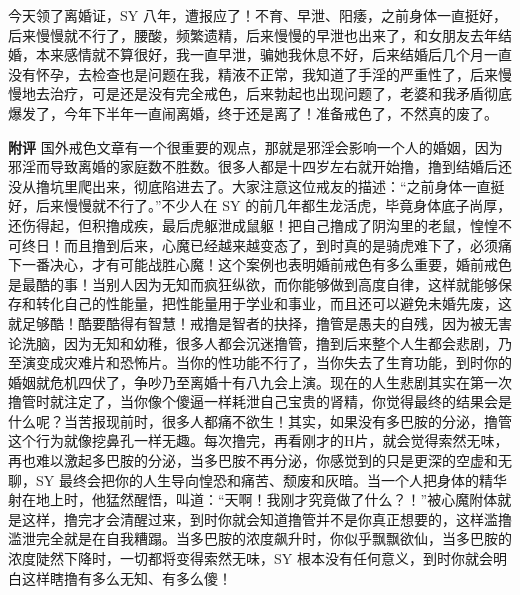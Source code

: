 \begin{case}
    今天领了离婚证，SY 八年，遭报应了！不育、早泄、阳痿，之前身体一直挺好，后来慢慢就不行了，腰酸，频繁遗精，后来慢慢的早泄也出来了，和女朋友去年结婚，本来感情就不算很好，我一直早泄，骗她我休息不好，后来结婚后几个月一直没有怀孕，去检查也是问题在我，精液不正常，我知道了手淫的严重性了，后来慢慢地去治疗，可是还是没有完全戒色，后来勃起也出现问题了，老婆和我矛盾彻底爆发了，今年下半年一直闹离婚，终于还是离了！准备戒色了，不然真的废了。

    \textbf{附评} 国外戒色文章有一个很重要的观点，那就是邪淫会影响一个人的婚姻，因为邪淫而导致离婚的家庭数不胜数。很多人都是十四岁左右就开始撸，撸到结婚后还没从撸坑里爬出来，彻底陷进去了。大家注意这位戒友的描述：“之前身体一直挺好，后来慢慢就不行了。”不少人在 SY 的前几年都生龙活虎，毕竟身体底子尚厚，还伤得起，但积撸成疾，最后虎躯泄成鼠躯！把自己撸成了阴沟里的老鼠，惶惶不可终日！而且撸到后来，心魔已经越来越变态了，到时真的是骑虎难下了，必须痛下一番决心，才有可能战胜心魔！这个案例也表明婚前戒色有多么重要，婚前戒色是最酷的事！当别人因为无知而疯狂纵欲，而你能够做到高度自律，这样就能够保存和转化自己的性能量，把性能量用于学业和事业，而且还可以避免未婚先废，这就足够酷！酷要酷得有智慧！戒撸是智者的抉择，撸管是愚夫的自残，因为被无害论洗脑，因为无知和幼稚，很多人都会沉迷撸管，撸到后来整个人生都会悲剧，乃至演变成灾难片和恐怖片。当你的性功能不行了，当你失去了生育功能，到时你的婚姻就危机四伏了，争吵乃至离婚十有八九会上演。现在的人生悲剧其实在第一次撸管时就注定了，当你像个傻逼一样耗泄自己宝贵的肾精，你觉得最终的结果会是什么呢？当苦报现前时，很多人都痛不欲生！其实，如果没有多巴胺的分泌，撸管这个行为就像挖鼻孔一样无趣。每次撸完，再看刚才的H片，就会觉得索然无味，再也难以激起多巴胺的分泌，当多巴胺不再分泌，你感觉到的只是更深的空虚和无聊，SY 最终会把你的人生导向惶恐和痛苦、颓废和灰暗。当一个人把身体的精华射在地上时，他猛然醒悟，叫道：“天啊！我刚才究竟做了什么？！”被心魔附体就是这样，撸完才会清醒过来，到时你就会知道撸管并不是你真正想要的，这样滥撸滥泄完全就是在自我糟蹋。当多巴胺的浓度飙升时，你似乎飘飘欲仙，当多巴胺的浓度陡然下降时，一切都将变得索然无味，SY 根本没有任何意义，到时你就会明白这样瞎撸有多么无知、有多么傻！
\end{case}

